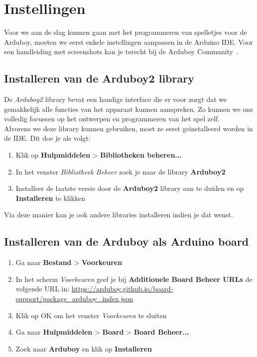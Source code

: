 \documentclass[11pt,fleqn]{book} %
\begin{document}
\section{Instellingen}
\label{sec:arduboy-instellingen}

Voor we aan de slag kunnen gaan met het programmeren van spelletjes voor de Arduboy, moeten we eerst enkele instellingen aanpassen in de Arduino IDE. Voor een handleiding met screenshots kan je terecht bij de Arduboy Community~\cite{arduboy:tuto1}.

\subsection{Installeren van de Arduboy2 library}
De \emph{Arduboy2} library bevat een handige interface die er voor zorgt dat we gemakkelijk alle functies van het apparaat kunnen aanspreken. Zo kunnen we ons volledig focussen op het ontwerpen en programmeren van het spel zelf. \\

\noindent
Alvorens we deze library kunnen gebruiken, moet ze eerst geïnstalleerd worden in de IDE. Dit doe je als volgt:

\begin{enumerate}
	\item Klik op \textbf{Hulpmiddelen} > \textbf{Bibliotheken beheren...}
	\item In het venster \emph{Bibliotheek Beheer} zoek je naar de library \textbf{Arduboy2}
	\item Installeer de laatste versie door de \textbf{Arduboy2} library aan te duiden en op \textbf{Installeren} te klikken
\end{enumerate}
Via deze manier kan je ook andere libraries installeren indien je dat wenst.

\subsection{Installeren van de Arduboy als Arduino board}
\begin{enumerate}
	\item Ga naar \textbf{Bestand} > \textbf{Voorkeuren}
	\item In het scherm \emph{Voorkeuren} geef je bij \textbf{Additionele Board Beheer URLs} de volgende URL in: \url{https://arduboy.github.io/board-support/package_arduboy_index.json}
	\item Klik op OK om het venster \emph{Voorkeuren} te sluiten
	\item Ga naar \textbf{Hulpmiddelen} > \textbf{Board} > \textbf{Board Beheer...}
	\item Zoek naar \textbf{Arduboy} en klik op \textbf{Installeren}
\end{enumerate}
\end{document}
